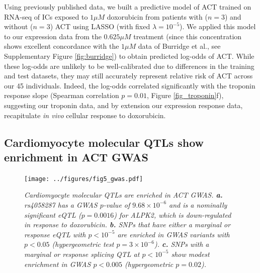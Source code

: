 \documentclass{article}
\begin{document}
Using previously published data\cite{Burridge2016}, we built a predictive model of ACT trained on RNA-seq of ICs exposed to $1 \mu M$ doxorubicin from patients with ($n=3$) and without ($n=3$) ACT using LASSO (with fixed $\lambda=10^{-5}$). We applied this model to our expression data from the $0.625 \mu M$ treatment (since this concentration shows excellent concordance with the $1 \mu M$ data of Burridge et al., see Supplementary Figure \ref{fig:burridge}) to obtain predicted log-odds of ACT. While these log-odds are unlikely to be well-calibrated due to differences in the training and test datasets, they may still accurately represent relative risk of ACT across our 45 individuals. Indeed, the log-odds correlated significantly with the troponin response slope (Spearman correlation $p=0.01$, Figure \ref{fig_troponin}f), suggesting our troponin data, and by extension our expression response data, recapitulate \emph{in vivo} cellular response to doxorubicin. 

\subsection*{Cardiomyocyte molecular QTLs show enrichment in ACT GWAS} 

\begin{figure}
\begin{center}
    \texttt{[image: ../figures/fig5\_gwas.pdf]}     \caption{\it{Cardiomyocyte molecular QTLs are enriched in ACT GWAS. \textbf{a.} rs4058287 has a GWAS $p$-value of $9.68\times 10^{-6}$ and is a nominally significant eQTL ($p=0.0016$) for \emph{ALPK2}, which is down-regulated in response to doxorubicin. \textbf{b.} SNPs that have either a marginal or response eQTL with $p<10^{-5}$ are enriched in GWAS variants with $p<0.05$ (hypergeometric test $p=3 \times 10^{-6}$). \textbf{c.} SNPs with a marginal or response splicing QTL at $p<10^{-5}$ show modest enrichment in GWAS $p<0.005$ (hypergeometric $p=0.02$).}}
    \label{fig:gwas}
    \end{center}
\end{figure}

\end{document}
